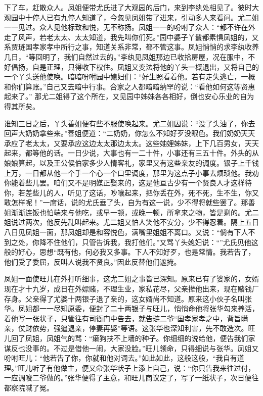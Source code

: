 下了车，赶散众人。凤姐便带尤氏进了大观园的后门，来到李纨处相见了。彼时大观园中十停人已有九停人知道了，今忽见凤姐带了进来，引动多人来看问。尤二姐一一见过。众人见他标致和悦，无不称扬。凤姐一一的吩咐了众人：``都不许在外走了风声，若老太太、太太知道，我先叫你们死。''园中婆子丫鬟都素惧凤姐的，又系贾琏国孝家孝中所行之事，知道关系非常，都不管这事。凤姐悄悄的求李纨收养几日，``等回明了，我们自然过去的。''李纨见凤姐那边已收拾房屋，况在服中，不好倡扬，自是正理，只得收下权住。凤姐又变法将他的丫头一概退出，又将自己的一个丫头送他使唤。暗暗吩咐园中媳妇们：``好生照看着他。若有走失逃亡，一概和你们算账。''自己又去暗中行事。合家之人都暗暗纳罕的说：``看他如何这等贤惠起来了。''
那尤二姐得了这个所在，又见园中姊妹各各相好，倒也安心乐业的自为得其所矣。

谁知三日之后，丫头善姐便有些不服使唤起来。尤二姐因说：``没了头油了，你去回声大奶奶拿些来。''善姐便道：``二奶奶，你怎么不知好歹没眼色。我们奶奶天天承应了老太太，又要承应这边太太那边太太。这些妯娌姊妹，上下几百男女，天天起来，都等他的话。一日少说，大事也有一二十件，小事还有三五十件。外头的从娘娘算起，以及王公侯伯家多少人情客礼，家里又有这些亲友的调度。银子上千钱上万，一日都从他一个手一个心一个口里调度，那里为这点子小事去烦琐他。我劝你能着些儿罢。咱们又不是明媒正娶来的，这是他亘古少有一个贤良人才这样待你，若差些儿的人，听见了这话，吵嚷起来，把你丢在外，死不死，生不生，你又敢怎样呢！''一席话，说的尤氏垂了头，自为有这一说，少不得将就些罢了。那善姐渐渐连饭也怕端来与他吃，或早一顿，或晚一顿，所拿来之物，皆是剩的。尤二姐说过两次，他反先乱叫起来。尤二姐又怕人笑他不安分，少不得忍着。隔上五日八日见凤姐一面，那凤姐却是和容悦色，满嘴里姐姐不离口。又说：``倘有下人不到之处，你降不住他们，只管告诉我，我打他们。''又骂丫头媳妇说：``''尤氏见他这般的好心，思想``既有他，何必我又多事。下人不知好歹，也是常情。我若告了，他们受了委屈，反叫人说我不贤良。''因此反替他们遮掩。

凤姐一面使旺儿在外打听细事，这尤二姐之事皆已深知。原来已有了婆家的，女婿现在才十九岁，成日在外嫖赌，不理生业，家私花尽，父亲撵他出来，现在赌钱厂存身。父亲得了尤婆十两银子退了亲的，这女婿尚不知道。原来这小伙子名叫张华。凤姐都一一尽知原委，便封了二十两银子与旺儿，悄悄命他将张华勾来养活，着他写一张状子，只管往有司衙门中告去，就告琏二爷``国孝家孝之中，背旨瞒亲，仗财依势，强逼退亲，停妻再娶''等语。这张华也深知利害，先不敢造次。旺儿回了凤姐，凤姐气的骂：``癞狗扶不上墙的种子。你细细的说给他，便告我们家谋反也没事的。不过是借他一闹，大家没脸。''旺儿领命，只得细说与张华。凤姐又吩咐旺儿：``他若告了你，你就和他对词去。''如此如此，这般这般，``我自有道理。''旺儿听了有他做主，便又命张华状子上添上自己，说：``你只告我来往过付，一应调唆二爷做的。''张华便得了主意，和旺儿商议定了，写了一纸状子，次日便往都察院喊了冤。

